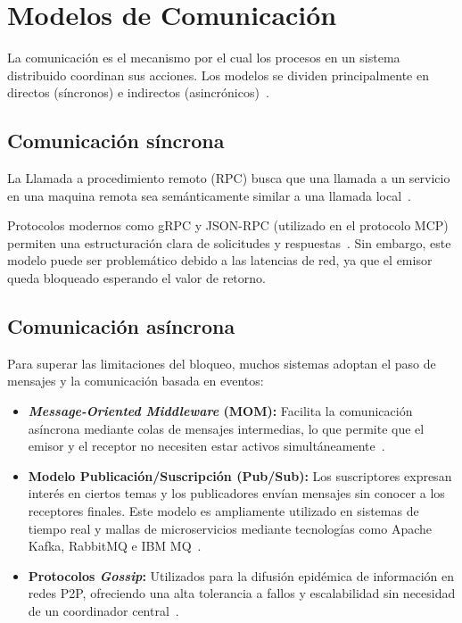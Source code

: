 \documentclass[12pt,a4paper]{article}
\begin{document}
\section{Modelos de Comunicación}

La comunicación es el mecanismo por el cual los procesos en un sistema distribuido coordinan sus acciones. Los modelos se dividen principalmente en directos (síncronos) e indirectos (asincrónicos)~\cite{r08}.

\subsection{Comunicación síncrona}

La Llamada a procedimiento remoto (RPC) busca que una llamada a un servicio en una maquina remota sea semánticamente similar a una llamada local~\cite{r08}.

Protocolos modernos como gRPC y JSON-RPC (utilizado en el protocolo MCP) permiten una estructuración clara de solicitudes y respuestas~\cite{r09}. Sin embargo, este modelo puede ser problemático debido a las latencias de red, ya que el emisor queda bloqueado esperando el valor de retorno.

\subsection{Comunicación asíncrona}

Para superar las limitaciones del bloqueo, muchos sistemas adoptan el paso de mensajes y la comunicación basada en eventos:

\begin{itemize}
    \item \textbf{\textit{Message-Oriented Middleware} (MOM):} Facilita la comunicación asíncrona mediante colas de mensajes intermedias, lo que permite que el emisor y el receptor no necesiten estar activos simultáneamente~\cite{r10}.

    \item \textbf{Modelo Publicación/Suscripción (Pub/Sub):} Los suscriptores expresan interés en ciertos temas y los publicadores envían mensajes sin conocer a los receptores finales. Este modelo es ampliamente utilizado en sistemas de tiempo real y mallas de microservicios mediante tecnologías como Apache Kafka, RabbitMQ e IBM MQ~\cite{r11}.

    \item \textbf{Protocolos \textit{Gossip}:} Utilizados para la difusión epidémica de información en redes P2P, ofreciendo una alta tolerancia a fallos y escalabilidad sin necesidad de un coordinador central~\cite{r12}.
\end{itemize}
\end{document}
